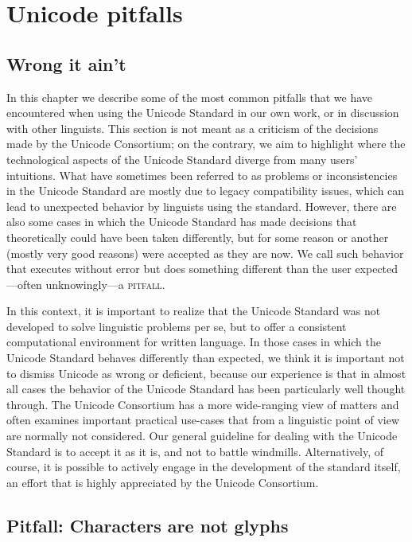 \chapter{Unicode pitfalls}
\label{unicode-pitfalls}

\section{Wrong it ain't}
\label{wrong-it-is-not}

In this chapter we describe some of the most common pitfalls that we have
encountered when using the Unicode Standard in our own work, or in discussion
with other linguists. This section is not meant as a criticism of the decisions
made by the Unicode Consortium; on the contrary, we aim to highlight where the
technological aspects of the Unicode Standard diverge from many users'
intuitions. What have sometimes been referred to as problems or inconsistencies
in the Unicode Standard are mostly due to legacy compatibility issues, which can
lead to unexpected behavior by linguists using the standard. However, there are
also some cases in which the Unicode Standard has made decisions that
theoretically could have been taken differently, but for some reason or another
(mostly very good reasons) were accepted as they are now. We call such behavior that
executes without error but does something different than the user
expected---often unknowingly---a \textsc{pitfall}.

In this context, it is important to realize that the Unicode Standard was not
developed to solve linguistic problems per se, but to offer a consistent
computational environment for written language. In those cases in which the
Unicode Standard behaves differently than expected, we think it is important not
to dismiss Unicode as wrong or deficient, because our
experience is that in almost all cases the behavior of the Unicode Standard has
been particularly well thought through. The Unicode Consortium has a more
wide-ranging view of matters and often examines important practical use-cases
that from a linguistic point of view are normally not considered. Our general
guideline for dealing with the Unicode Standard is to accept it as it is, and
not to battle windmills. Alternatively, of course, it is possible to actively
engage in the development of the standard itself, an effort that is highly
appreciated by the Unicode Consortium.

\section{Pitfall: Characters are not glyphs}
\label{pitfall-characters-are-not-glyphs}

